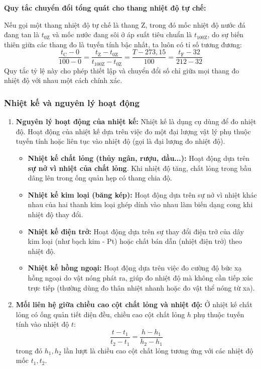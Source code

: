 \begin{emcobiet}
	\textbf{Quy tắc chuyển đổi tổng quát cho thang nhiệt độ tự chế:}
	
	Nếu gọi một thang nhiệt độ tự chế là thang $\mathrm{Z}$, trong đó mốc nhiệt độ nước đá đang tan là $t_{0\mathrm{Z}}$ và mốc nước đang sôi ở áp suất tiêu chuẩn là $t_{100\mathrm{Z}}$, do sự biến thiên giữa các thang đo là tuyến tính bậc nhất, ta luôn có tỉ số tương đương:
	\[
	\dfrac{t_\mathrm{C} - 0}{100 - 0} = \dfrac{t_\mathrm{Z} - t_{0\mathrm{Z}}}{t_{100\mathrm{Z}} - t_{0\mathrm{Z}}} = \dfrac{T - 273{,}15}{100} = \dfrac{t_\mathrm{F} - 32}{212 - 32}
	\]
	Quy tắc tỷ lệ này cho phép thiết lập và chuyển đổi số chỉ giữa mọi thang đo nhiệt độ với nhau một cách chính xác.
\end{emcobiet}

\subsubsection{Nhiệt kế và nguyên lý hoạt động}

\begin{kienthuc}
	\begin{enumerate}
		\item \textbf{Nguyên lý hoạt động của nhiệt kế:}
		Nhiệt kế là dụng cụ dùng để đo nhiệt độ. Hoạt động của nhiệt kế dựa trên việc đo một đại lượng vật lý phụ thuộc tuyến tính hoặc liên tục vào nhiệt độ (gọi là đại lượng đo nhiệt độ).
		\begin{itemize}
			\item \textbf{Nhiệt kế chất lỏng (thủy ngân, rượu, dầu...):} Hoạt động dựa trên \textbf{sự nở vì nhiệt của chất lỏng}. Khi nhiệt độ tăng, chất lỏng trong bầu dâng lên trong ống quản hẹp có thang chia độ.
			\item \textbf{Nhiệt kế kim loại (băng kép):} Hoạt động dựa trên sự nở vì nhiệt khác nhau của hai thanh kim loại ghép dính vào nhau làm biến dạng cong khi nhiệt độ thay đổi.
			\item \textbf{Nhiệt kế điện trở:} Hoạt động dựa trên sự thay đổi điện trở của dây kim loại (như bạch kim - Pt) hoặc chất bán dẫn (nhiệt điện trở) theo nhiệt độ.
			\item \textbf{Nhiệt kế hồng ngoại:} Hoạt động dựa trên việc đo cường độ bức xạ hồng ngoại do vật nóng phát ra, giúp đo nhiệt độ mà không cần tiếp xúc trực tiếp (thường dùng đo thân nhiệt nhanh hoặc đo vật thể nóng từ xa).
		\end{itemize}
		\item \textbf{Mối liên hệ giữa chiều cao cột chất lỏng và nhiệt độ:}
		Ở nhiệt kế chất lỏng có ống quản tiết diện đều, chiều cao cột chất lỏng $h$ phụ thuộc tuyến tính vào nhiệt độ $t$:
		\[
		\dfrac{t - t_1}{t_2 - t_1} = \dfrac{h - h_1}{h_2 - h_1}
		\]
		trong đó $h_1, h_2$ lần lượt là chiều cao cột chất lỏng tương ứng với các nhiệt độ mốc $t_1, t_2$.
	\end{enumerate}
\end{kienthuc}

